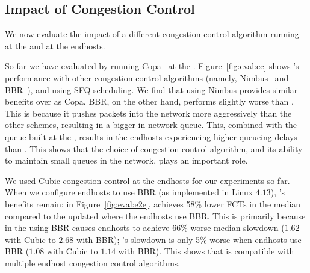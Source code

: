 \subsection{Impact of Congestion Control} \label{s:eval:cc}

We now evaluate the impact of a different congestion control algorithm running at the \inbox and at the endhosts.



 So far we have evaluated \name by running Copa~\cite{copa} at the \inbox.  
Figure~\ref{fig:eval:cc} shows \name's performance with other congestion control algorithms (namely, Nimbus~\cite{nimbus} and BBR~\cite{bbr}), and using SFQ scheduling. 
We find that using Nimbus provides similar benefits over \baseline as Copa. 
BBR, on the other hand, performs slightly worse than \baseline. 
This is because it pushes packets into the network more aggressively than the other schemes, resulting in a bigger in-network queue.
This, combined with the queue built at the \name, results in the endhosts experiencing higher queueing delays than \baseline. This shows that the choice of congestion control algorithm, and its ability to maintain small queues in the network, plays an important role. 


We used Cubic congestion control at the endhosts for our experiments so far. When we configure endhosts to use BBR (as implemented in Linux $4.13$), \name's benefits remain: in Figure~\ref{fig:eval:e2e}, \name achieves 58\% lower FCTs in the median compared to the updated \baseline where the endhosts use BBR. 
This is primarily because in the \baseline using BBR causes endhosts to achieve 66\% worse median slowdown ($1.62$ with Cubic to $2.68$ with BBR); \name's slowdown is only 5\% worse when endhosts use BBR ($1.08$ with Cubic to $1.14$ with BBR). 
This shows that \name is compatible with multiple endhost congestion control algorithms.
